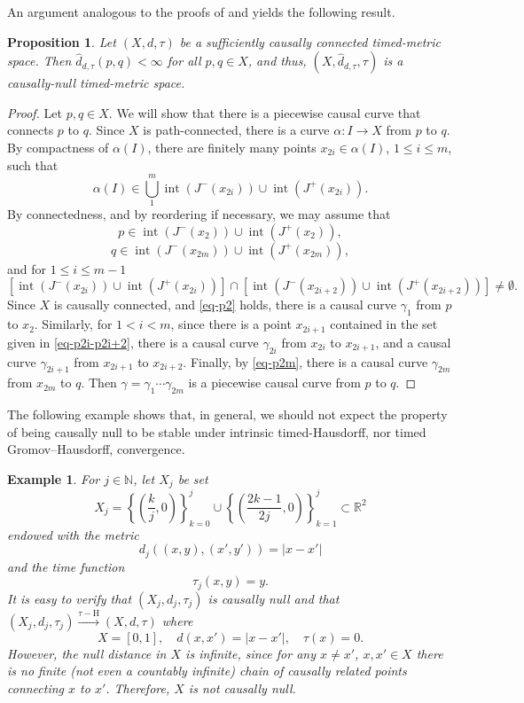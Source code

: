 \documentclass[a4paper,12pt,reqno]{amsart}
\theoremstyle{plain}
\newtheorem{prop}[thm]{Proposition}
\newtheorem{example}[thm]{Example}
\newcommand{\tHto}{\stackrel { \tau-\textrm{H}}{\longrightarrow} }
\newcommand{\be}{\begin{equation}}
\newcommand{\ee}{\end{equation}}
\DeclareMathOperator{\interior}{int}
\begin{document}
An argument analogous to the proofs of \cite[Lemma~3.5]{Kunzinger-Steinbauer-22} and \cite[Lemma~3.5]{SV-Null} yields the following result. 


\begin{prop}\label{prop:scc imply causally null}
Let $(X,d,\tau)$ be a sufficiently causally connected timed-metric space. Then $\hat{d}_{d,\tau}(p,q)<\infty$ for all $p,q\in X$, and thus, $(X,\hat{d}_{d,\tau},\tau)$ is a causally-null timed-metric space. 
\end{prop} 

\begin{proof}
Let $p, q \in X$. We will show that 
there is a piecewise causal curve that connects $p$ to $q$.  Since $X$ is path-connected, there is a curve 
$\alpha: I \to X$ from $p$ to $q$. 
By compactness of $\alpha(I)$, there are finitely many
points $x_{2i} \in \alpha(I)$,  $1\leq i \leq m$, 
such that 
\be
\alpha(I) \in  \bigcup_{1}^m \interior(J^-(x_{2i}))\cup \interior(J^+(x_{2i})).
\ee
By connectedness, and by reordering
if necessary, we may assume that 
\be\label{eq-p2}
p \in
\interior(J^-(x_{2}))\cup \interior(J^+(x_{2})),
\ee
\be\label{eq-p2m}
q \in 
\interior(J^-(x_{2m}))\cup \interior(J^+(x_{2m})),
\ee
and for $1 \leq i \leq m-1$
\be\label{eq-p2i-p2i+2}
[\interior(J^-(x_{2i}))\cup \interior(J^+(x_{2i}))]
\cap [\interior(J^-(x_{2i+2}))\cup \interior(J^+(x_{2i+2}))]
 \neq \emptyset.
 \ee
Since $X$ is causally connected, 
and \eqref{eq-p2} holds, there is a causal curve $\gamma_1$ from $p$ to
$x_2$. Similarly, for $1< i < m$, since there is a point
$x_{2i+1}$ contained in the set given in \eqref{eq-p2i-p2i+2}, there is a causal curve
$\gamma_{2i}$ from $x_{2i}$ to $x_{2i+1}$, and a causal curve
$\gamma_{2i+1}$ from $x_{2i+1}$ to $x_{2i+2}$. Finally, by \eqref{eq-p2m}, there is a causal curve $\gamma_{2m}$ from $x_{2m}$
to $q$. Then $\gamma = \gamma_1 \cdots \gamma_{2m}$ is a piecewise causal curve
from $p$ to $q$. 
\end{proof}





The following example shows that, in general, we should not expect the property of being causally null to be stable under intrinsic timed-Hausdorff, nor timed Gromov--Hausdorff, convergence.
\begin{example}\label{ex:causally null not preserved}
For $j \in \mathbb N$, let $X_j$ be set
\be
X_j = \left\{
\left(\frac{k}{j},0\right)
\right\}_{k=0}^{j}
\cup\left\{
\left(\frac{2k-1}{2j},0\right)
\right\}_{k=1}^{j}\subset \mathbb{R}^2
\ee
endowed with the metric
\be
d_j((x,y),(x',y')) = |x-x'|
\ee
and the time function
\be
\tau_j(x,y) = y.
\ee
It is easy to verify that $(X_j,d_j,\tau_j)$ is causally null and that $(X_j,d_j,\tau_j)\tHto (X,d,\tau)$ where
\be
X = [0,1], \quad d(x,x') = |x-x'|, \quad \tau(x) = 0. 
\ee
However, the null distance in $X$ is infinite, since for any $x\neq x'$, $x,x'\in X$ there is no finite (not even a countably infinite) chain of causally related points connecting $x$ to $x'$. Therefore, $X$ is not causally null.
\end{example}
\end{document}
